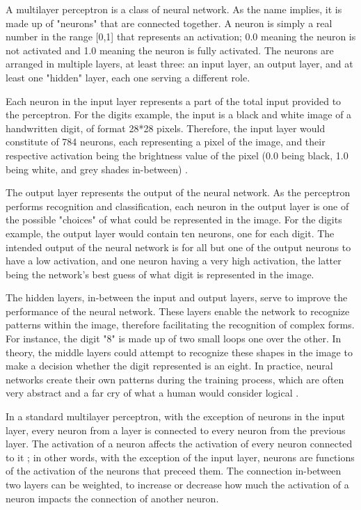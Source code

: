 \documentclass[12pt,a4paper,titlepage]{article}
\begin{document}
A multilayer perceptron is a class of neural network. As the name implies, it is made up of "neurons" that are connected together. A neuron is simply a real number in the range [0,1] that represents an activation; 0.0 meaning the neuron is not activated and 1.0 meaning the neuron is fully activated. The neurons are arranged in multiple layers, at least three: an input layer, an output layer, and at least one "hidden" layer, each one serving a different role.

Each neuron in the input layer represents a part of the total input provided to the perceptron. For the digits example, the input is a black and white image of a handwritten digit, of format 28*28 pixels. Therefore, the input layer would constitute of 784 neurons, each representing a pixel of the image, and their respective activation being the brightness value of the pixel (0.0 being black, 1.0 being white, and grey shades in-between) \cite{sanderson_but_2017}.

The output layer represents the output of the neural network. As the perceptron performs recognition and classification, each neuron in the output layer is one of the possible "choices" of what could be represented in the image. For the digits example, the output layer would contain ten neurons, one for each digit. The intended output of the neural network is for all but one of the output neurons to have a low activation, and one neuron having a very high activation, the latter being the network's best guess of what digit is represented in the image.

The hidden layers, in-between the input and output layers, serve to improve the performance of the neural network. These layers enable the network to recognize patterns within the image, therefore facilitating the recognition of complex forms. For instance, the digit "8" is made up of two small loops one over the other. In theory, the middle layers could attempt to recognize these shapes in the image to make a decision whether the digit represented is an eight. In practice, neural networks create their own patterns during the training process, which are often very abstract and a far cry of what a human would consider logical \cite{sanderson_gradient_2017}.

In a standard multilayer perceptron, with the exception of neurons in the input layer, every neuron from a layer is connected to every neuron from the previous layer. The activation of a neuron affects the activation of every neuron connected to it ; in other words, with the exception of the input layer, neurons are functions of the activation of the neurons that preceed them. The connection in-between two layers can be weighted, to increase or decrease how much the activation of a neuron impacts the connection of another neuron.
\end{document}
